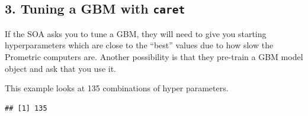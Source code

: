 \documentclass[openany]{book}
\newenvironment{Shaded}{\begin{snugshade}}{\end{snugshade}}
\newcommand{\DataTypeTok}[1]{\textcolor[rgb]{0.13,0.29,0.53}{#1}}
\newcommand{\DecValTok}[1]{\textcolor[rgb]{0.00,0.00,0.81}{#1}}
\newcommand{\FloatTok}[1]{\textcolor[rgb]{0.00,0.00,0.81}{#1}}
\newcommand{\KeywordTok}[1]{\textcolor[rgb]{0.13,0.29,0.53}{\textbf{#1}}}
\newcommand{\NormalTok}[1]{#1}
\newcommand{\OperatorTok}[1]{\textcolor[rgb]{0.81,0.36,0.00}{\textbf{#1}}}
\newcommand{\StringTok}[1]{\textcolor[rgb]{0.31,0.60,0.02}{#1}}
\begin{document}
\hypertarget{tuning-a-gbm-with-caret}{%
\subsection{\texorpdfstring{3. Tuning a GBM with \texttt{caret}}{3. Tuning a GBM with caret}}\label{tuning-a-gbm-with-caret}}

If the SOA asks you to tune a GBM, they will need to give you starting hyperparameters which are close to the ``best'' values due to how slow the Prometric computers are. Another possibility is that they pre-train a GBM model object and ask that you use it.

This example looks at 135 combinations of hyper parameters.

\begin{Shaded}
\end{Shaded}

\begin{verbatim}
## [1] 135
\end{verbatim}
\end{document}
